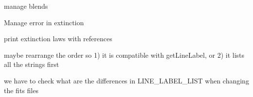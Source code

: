 
\begin{DoxyRefList}
\item[\label{todo__todo000002}%
\hypertarget{todo__todo000002}{}%
Member \hyperlink{classpyneb_1_1core_1_1pynebcore_1_1_atom_ad1d75f64b27a6acee079b5738b69dabe}{pyneb.core.pynebcore.Atom.\-\_\-get\-Tem\-Den\-\_\-1} ]manage blends  
\item[\label{todo__todo000004}%
\hypertarget{todo__todo000004}{}%
Member \hyperlink{classpyneb_1_1extinction_1_1red__corr_1_1_red_corr_a27b836e3bd87558f6156a8bf94fbf658}{pyneb.extinction.red\-\_\-corr.Red\-Corr.\-\_\-\-\_\-init\-\_\-\-\_\-} ]Manage error in extinction 

print extinction laws with references  
\item[\label{todo__todo000001}%
\hypertarget{todo__todo000001}{}%
Member \hyperlink{namespacepyneb_1_1core_1_1pynebcore_a15b88e2a4daeae68052060cb425c7a1c}{pyneb\-:\-:core\-:\-:pynebcore.parse\-Line\-Label} ]maybe rearrange the order so 1) it is compatible with get\-Line\-Label, or 2) it lists all the strings first  
\item[\label{todo__todo000003}%
\hypertarget{todo__todo000003}{}%
Member \hyperlink{namespacepyneb_1_1utils_1_1init_adeccc39c0a14a054bc294f2c3ddf9b1c}{pyneb\-:\-:utils\-:\-:init.\-\_\-print\-\_\-\-L\-I\-N\-E\-\_\-\-L\-A\-B\-E\-L\-\_\-\-L\-I\-S\-T} ]we have to check what are the differences in L\-I\-N\-E\-\_\-\-L\-A\-B\-E\-L\-\_\-\-L\-I\-S\-T when changing the fits files 
\end{DoxyRefList}